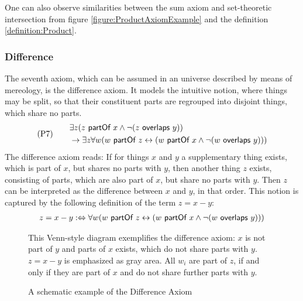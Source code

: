 One can also observe similarities between the sum axiom and set-theoretic intersection from figure \ref{figure:ProductAxiomExample} and the definition \ref{definition:Product}.

\subsubsection{Difference}
The seventh axiom, which can be assumed in an universe described by means of mereology, is the difference axiom.
It models the intuitive notion, where things may be split, so that their constituent parts are regrouped into disjoint things, which share no parts.
\begin{align}
&\text{(P7)}
\quad
&\begin{split}
&\exists z (z ~\textsf{partOf}~ x \wedge \neg(z ~\textsf{overlaps}~ y))
\\&\rightarrow
\exists z \forall w (w ~\textsf{partOf}~ z \leftrightarrow (w ~\textsf{partOf}~ x \wedge \neg(w ~\textsf{overlaps}~ y)))
\end{split}
\label{axiom:Difference}
\end{align}
The difference axiom reads:
If for things $x$ and $y$ a supplementary thing exists, which is part of $x$, but shares no parts with $y$, then another thing $z$ exists, consisting of parts, which are also part of $x$, but share no parts with $y$.
Then $z$ can be interpreted as the difference between $x$ and $y$, in that order.
This notion is captured by the following definition of the term $z = x - y$:
\begin{align}
z = x - y
:\Leftrightarrow
\forall w (w ~\textsf{partOf}~ z \leftrightarrow (w ~\textsf{partOf}~ x \wedge \neg(w ~\textsf{overlaps}~ y)))
\label{definition:Difference}
\end{align}

\begin{figure}[h!]
\begin{center}
\end{center}
{
\scriptsize 
This Venn-style diagram exemplifies the difference axiom:
$x$ is not part of $y$ and parts of $x$ exists, which do not share parts with $y$.
$z = x - y$ is emphasized as gray area.
All $w_i$ are part of $z$, if and only if they are part of $x$ and do not share further parts with $y$.
}
\caption{A schematic example of the Difference Axiom}
\label{figure:DifferenceAxiomExample}
\end{figure}

